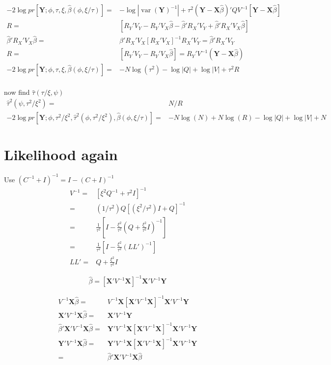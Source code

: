 \documentclass[12pt]{article}
\DeclareMathOperator{\var}{var}
\begin{document}
\begin{align*}
-2 \log pr[\mathbf{Y};\phi,\tau, \xi ,\hat\beta(\phi, \xi/\tau)] = &
-\log |\var(\mathbf{Y})^{-1}| + \tau^2 ( \mathbf{Y} -\mathbf{X}\hat\beta) '
  Q V^{-1} 
 [\mathbf{Y} - \mathbf{X}\hat\beta ] \\
R=&  [R_Y' V_Y - R_Y' V_X \hat\beta - \hat\beta ' R_X' V_Y + \hat\beta 'R_X'
V_X \hat\beta ] \\
\hat\beta 'R_X'
V_X \hat\beta = &  \hat\beta' R_X' V_X [ R_X' V_X ]^{-1}  R_X' V_Y =
 \hat\beta ' R_X' V_Y   \\
R = &[R_Y' V_Y - R_Y' V_X \hat\beta] = R_Y' V^{-1} ( \mathbf{Y} -
\mathbf{X}\hat\beta)\\
-2 \log pr[\mathbf{Y};\phi,\tau, \xi ,\hat\beta(\phi, \xi/\tau)] =& -N \log (\tau^2) -\log|Q| + \log|V| +  \tau^2 R\\
\end{align*}

now find $\hat\tau(\tau/\xi, \psi)$
\begin{align*}
\hat\tau^2(\psi, \tau^2/\xi^2) = &  N/R \\
-2 \log pr[\mathbf{Y};\phi,\tau^2/\xi^2, \hat\tau^2(\phi, \tau^2/\xi^2), \hat\beta(\phi, \xi/\tau)] = & -N\log(N) + N \log (R)   -\log|Q| +
\log|V|+N
\end{align*}


\section*{Likelihood again}

Use $(C^{-1} + I)^{-1} = I-(C+I)^{-1}$ 
\begin{align*}
V^{-1} = &[\xi^2 Q^{-1} + \tau^2 I]^{-1}\\
=& (1/\tau^2) Q [(\xi^2/\tau^2)I + Q]^{-1}\\
 = & \frac{1}{\tau^2} \left[ I -  \frac{\xi^2 }{\tau^2} \left(Q +  \frac{\xi^2 }{\tau^2}  I\right)^{-1}  \right]\\
 =& \frac{1}{\tau^2} \left[ I -  \frac{\xi^2 }{\tau^2}\left(L L'  \right)^{-1}  \right]\\
L L'= &  Q +  \frac{\xi^2 }{\tau^2}  I
\end{align*}



\[
\hat\beta = [ \mathbf{X}'
 V^{-1}   \mathbf{X}]^{-1}
\mathbf{X}'V^{-1} \mathbf{Y}
\]

\begin{align*}
V^{-1} \mathbf{X} \hat\beta =& 
V^{-1} \mathbf{X} [ \mathbf{X}' V^{-1}   \mathbf{X}]^{-1}
\mathbf{X}' V^{-1} \mathbf{Y}\\
\mathbf{X}' V^{-1} \mathbf{X}  \hat\beta= &\mathbf{X}' V^{-1} \mathbf{Y}\\
\hat\beta' \mathbf{X}' V^{-1} \mathbf{X}  \hat\beta = & \mathbf{Y}'  V^{-1}   \mathbf{X}[ \mathbf{X}'
 V^{-1}   \mathbf{X}]^{-1}\mathbf{X}' V^{-1} \mathbf{Y}\\
 \mathbf{Y}' V^{-1} \mathbf{X}  \hat\beta = & \mathbf{Y}'V^{-1} \mathbf{X} [ \mathbf{X}' V^{-1}   \mathbf{X}]^{-1}
\mathbf{X}' V^{-1} \mathbf{Y}\\
= & \hat\beta' \mathbf{X}' V^{-1} \mathbf{X}  \hat\beta
\end{align*}
\end{document}
